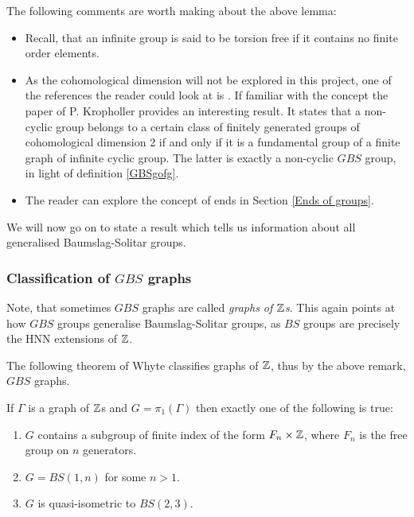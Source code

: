\begin{remark}
    The following comments are worth making about the above lemma:
    \begin{itemize}
        \item Recall, that an infinite group is said to be torsion free if it contains no finite order elements.
        \item As the cohomological dimension will not be explored in this project, one of the references the reader could look at is \cite{Br}. If familiar with the concept the paper of P. Kropholler \cite[Theorem C]{Kr90} provides an interesting result. It states that a non-cyclic group belongs to a certain class of finitely generated groups of cohomological dimension 2 if and only if it is a fundamental group of a finite graph of infinite cyclic group. The latter is exactly a non-cyclic $GBS$ group, in light of definition \ref{GBSgofg}.
        \item The reader can explore the concept of ends in Section \ref{Ends of groups}.
    \end{itemize}
\end{remark}

We will now go on to state a result which tells us information about all generalised Baumslag-Solitar groups.

\subsubsection{Classification of $GBS$ graphs}

\begin{remark}
    Note, that sometimes $GBS$ graphs are called \emph{graphs of $\mathbb{Z}$s}. This again points at how $GBS$ groups generalise Baumslag-Solitar groups, as $BS$ groups are precisely the HNN extensions of $\mathbb{Z}$.
\end{remark}

The following theorem of Whyte classifies graphs of $\mathbb{Z}$, thus by the above remark, $GBS$ graphs.

\begin{theorem}\cite[Theorem 0.1]{WH01}\label{classgrZ}
    If $\Gamma$ is a graph of $\mathbb{Z}$s and $G= \pi_1(\Gamma)$ then exactly one of the following is true:
    \begin{enumerate}
        \item $G$ contains a subgroup of finite index of the form $F_n \times \mathbb{Z}$, where $F_n$ is the free group on $n$ generators.
        \item $G = BS(1,n)$ for some $n > 1$.
        \item $G$ is quasi-isometric to $BS(2,3)$.
    \end{enumerate}
\end{theorem}

